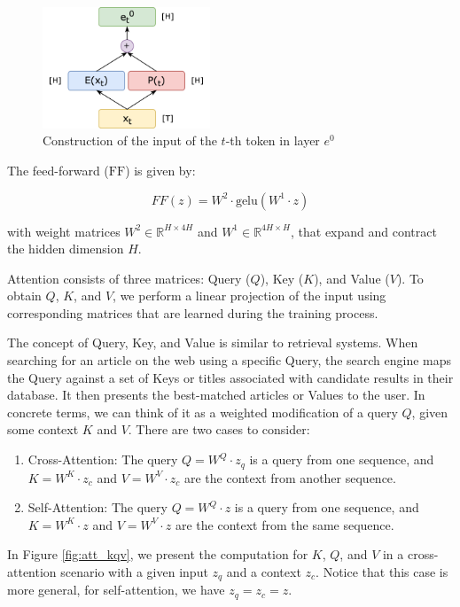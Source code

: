 \begin{figure}[h]
    \centering
    \includegraphics[width=5cm]{pages/imgs/e0.png}
    \caption{Construction of the input of the $t$-th token in layer $e^0$}
    \label{fig:e0}
\end{figure}



\noindent The feed-forward ($\mathrm{FF}$) is given by:

\begin{equation}
FF(z) = W^2\cdot \mathrm{gelu}(W^1 \cdot z)
\end{equation}

\noindent with weight matrices $W^2 \in \mathbb{R}^{H \times 4H}$ and $W^1 \in \mathbb{R}^{4H \times H}$, that expand and contract the hidden dimension $H$.

Attention consists of three matrices: Query ($Q$), Key ($K$), and Value ($V$). To obtain $Q$, $K$, and $V$, we perform a linear projection of the input using corresponding matrices that are learned during the training process.

The concept of Query, Key, and Value is similar to retrieval systems. When searching for an article on the web using a specific Query, the search engine maps the Query against a set of Keys or titles associated with candidate results in their database. It then presents the best-matched articles or Values to the user.
In concrete terms, we can think of it as a weighted modification of a query $Q$, given some context $K$ and $V$. There are two cases to consider:
\begin{enumerate}
    \item Cross-Attention: The query $Q=W^Q\cdot z_q$ is a query from one sequence, and $K=W^K\cdot z_c$ and $V=W^V\cdot z_c$ are the context from another sequence.
    \item Self-Attention: The query $Q=W^Q\cdot z$ is a query from one sequence, and $K=W^K\cdot z$ and $V=W^V\cdot z$ are the context from the same sequence.
\end{enumerate}
In Figure \ref{fig:att_kqv}, we present the computation for $K$, $Q$, and $V$ in a cross-attention scenario with a given input $z_q$ and a context $z_c$. Notice that this case is more general, for self-attention, we have $z_q=z_c=z$.

